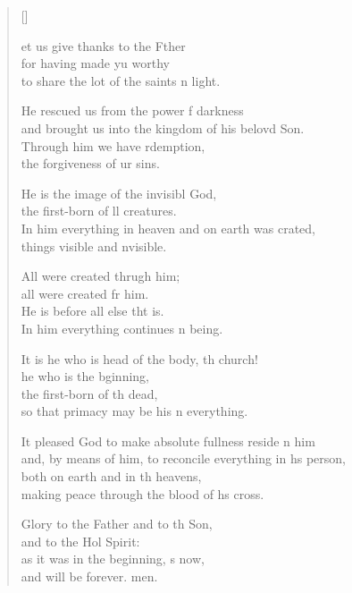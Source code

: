 \settowidth{\versewidth}{and, by means of him, to reconcile everything in his person,}
\begin{verse}[\versewidth]
  \begin{patverse}
et us give thanks to the Fther\Flex\\
for having made yu worthy\Med\\
to share the lot of the saints \pointup{\i}n light.

He rescued us from the power f darkness\Med\\
and brought us into the kingdom of his belovd Son.\\
Through him we have rdemption,\Med\\
the forgiveness of ur sins.

He is the image of the invisibl God,\Med\\
the first-born of ll creatures.\\
In him everything in heaven and on earth was crated,\Med\\
things visible and \pointup{\i}nvisible.

All were created thrugh him;\Med\\
all were created fr him.\\
He is before all else tht is.\Med\\
In him everything continues \pointup{\i}n being.

It is he who is head of the body, th church!\Med\\
he who is the bginning,\\
the first-born of th dead,\Med\\
so that primacy may be his \pointup{\i}n everything.

It pleased God to make absolute fullness reside \pointup{\i}n him\Med\\
and, by means of him, to reconcile everything in h\pointup{\i}s person,\\
both on earth and in th heavens,\Med\\
making peace through the blood of h\pointup{\i}s cross.

Glory to the Father and to th Son,\Med\\
and to the Hol Spirit:\\
as it was in the beginning, \pointup{\i}s now,\Med\\
and will be forever. men. 
  \end{patverse}
\end{verse}
